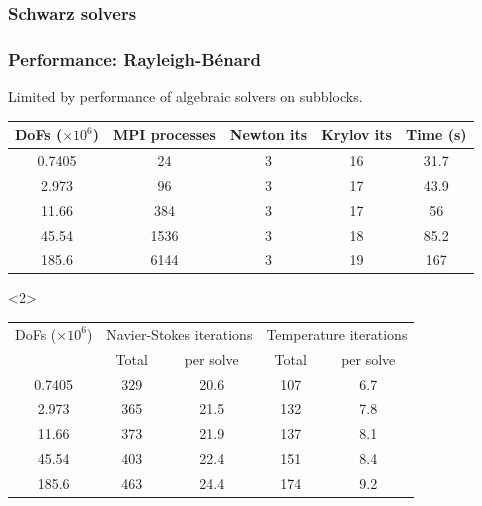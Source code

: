 \documentclass[presentation,aspectratio=43]{beamer}
\begin{document}
\begin{frame}
  \frametitle{Schwarz solvers}
  
\end{frame}
\begin{frame}
  \frametitle{Performance: Rayleigh-B\'enard}
  Limited by performance of algebraic solvers on subblocks.
  \begin{center}
    \scriptsize
  \begin{tabular}{c|c|c|c|c}
DoFs ($\times 10^{6}$) & MPI processes & Newton its & Krylov its & Time (s)\\
\hline
0.7405 & 24 & 3 & 16 & 31.7\\
2.973 & 96 & 3 & 17 & 43.9\\
11.66 & 384 & 3 & 17 & 56\\
45.54 & 1536 & 3 & 18 & 85.2\\
185.6 & 6144 & 3 & 19 & 167\\
  \end{tabular}

  \begin{uncoverenv}<2>
  \begin{tabular}{c|c|c|c|c}
    DoFs ($\times 10^{6}$) & \multicolumn{2}{|c|}{Navier-Stokes iterations} & \multicolumn{2}{|c}{Temperature iterations}\\
    & Total & per solve & Total & per solve\\
\hline
0.7405 & 329 & 20.6 & 107 & 6.7 \\
2.973  & 365 & 21.5 & 132 & 7.8 \\
11.66  & 373 & 21.9 & 137 & 8.1 \\
45.54  & 403 & 22.4 & 151 & 8.4 \\
185.6  & 463 & 24.4 & 174 & 9.2 \\
  \end{tabular}
\end{uncoverenv}
  \end{center}
\end{frame}
\end{document}
